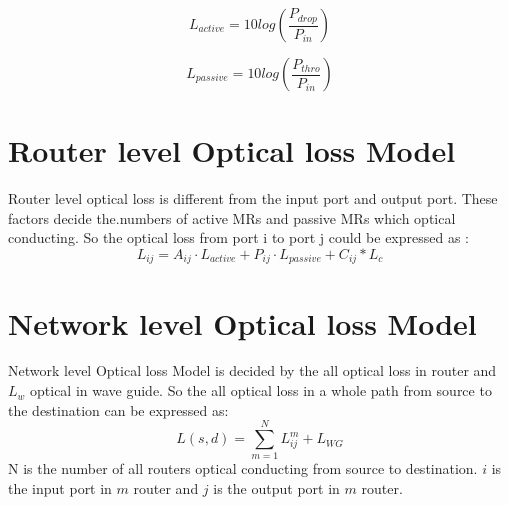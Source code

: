 \documentclass[12pt]{article}
\begin{document}
\begin{equation}
\label{active MR loss} 
L_{active} = 10log(\frac{P_{drop}}{P_{in}})
\end{equation}

\begin{equation}
\label{active MR loss} 
L_{passive} = 10log(\frac{P_{thro}}{P_{in}})
\end{equation}

\section{Router level Optical loss Model}
Router level optical loss is different from the input port and output port. These factors decide the.numbers of active MRs and passive MRs which optical conducting. So the optical loss from port i to port j could be expressed as :
\begin{equation}
\label{active MR loss} 
L_{ij} = A_{ij}\cdot L_{active} + P_{ij}\cdot L_{passive} + C_{ij}*L_{c}
\end{equation}

\section{Network level Optical loss Model}
Network level Optical loss Model is decided by the all optical loss in router and $L_{w}$ optical in wave guide. So the all optical loss in a whole path from source to the destination can be expressed as:
\begin{equation}
\label{active MR loss} 
L(s, d) = \sum_{m=1}^{N}L_{ij}^{m} + L_{WG}
\end{equation}
N is the number of all routers optical conducting from source to destination. $i$ is the input port in  $m$ router and $j$ is the output port in $m$ router. 



\end{document}
